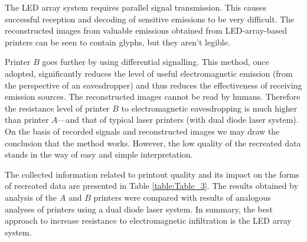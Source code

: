 \documentclass[12pt,a4paper]{article}
\begin{document}
The LED array system requires parallel signal transmission. This causes
successful reception and decoding of sensitive emissions to be very
difficult. The reconstructed images from valuable emissions obtained from
LED-array-based printers can be seen to contain glyphs, but they
aren't legible.

Printer $B$ goes further by using differential signalling. This method, once
adopted, significantly reduces the level of useful electromagnetic emission
(from the perspective of an eavesdropper) and thus reduces the effectiveness
of receiving emission sources. The reconstructed images cannot be read by
humans. Therefore the resistance level of printer $B$ to electromagnetic
eavesdropping is much higher than printer $A$---and that of typical
laser printers (with dual diode laser system). On the basis of recorded
signals and reconstructed images we may draw the conclusion that the method
works. However, the low quality of the recreated data stands in the way of
easy and simple interpretation.

The collected information related to printout quality and its impact on the
forms of recreated data are presented in Table \ref{table:Table_3}. The
results obtained by analysis of the $A$ and $B$ printers were compared with
results of analogous analyses of printers using a dual diode laser system. In
summary, the best approach to increase resistance to electromagnetic
infiltration is the LED array system.

\singlespacing



\end{document}
